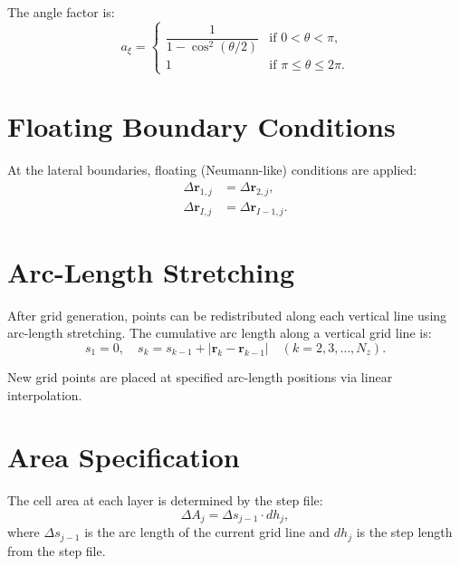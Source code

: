 \documentclass[11pt,a4paper]{report}
\newcommand{\rvec}{\bm{r}}
\begin{document}
The angle factor is:
\begin{equation}
    a_\xi = \begin{cases} \dfrac{1}{1 - \cos^2(\theta/2)} & \text{if } 0 < \theta < \pi, \\ 1 & \text{if } \pi \le \theta \le 2\pi. \end{cases}
\end{equation}

\section{Floating Boundary Conditions}

At the lateral boundaries, floating (Neumann-like) conditions are applied:
\begin{equation}
\begin{aligned}
    \Delta \rvec_{1,j} &= \Delta \rvec_{2,j}, \\
    \Delta \rvec_{I,j} &= \Delta \rvec_{I-1,j}.
\end{aligned}
\end{equation}

\section{Arc-Length Stretching}

After grid generation, points can be redistributed along each vertical line using arc-length stretching. The cumulative arc length along a vertical grid line is:
\begin{equation}
    s_1 = 0, \quad s_k = s_{k-1} + |\rvec_k - \rvec_{k-1}| \quad (k = 2, 3, \ldots, N_z).
\end{equation}

New grid points are placed at specified arc-length positions via linear interpolation.

\section{Area Specification}

The cell area at each layer is determined by the step file:
\begin{equation}
    \Delta A_j = \Delta s_{j-1} \cdot dh_j,
\end{equation}
where $\Delta s_{j-1}$ is the arc length of the current grid line and $dh_j$ is the step length from the step file.

\end{document}
